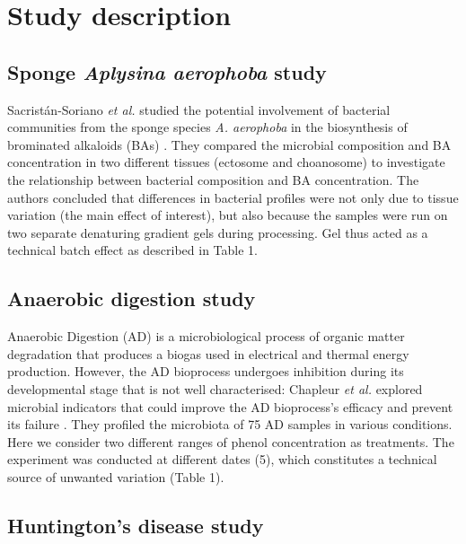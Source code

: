 \documentclass[]{book}
\begin{document}
\section{Study description}\label{study-description}

\subsection{\texorpdfstring{Sponge \emph{Aplysina aerophoba}
study}{Sponge Aplysina aerophoba study}}\label{sponge-aplysina-aerophoba-study}

Sacristán-Soriano \emph{et al.} studied the potential involvement of
bacterial communities from the sponge species \emph{A. aerophoba} in the
biosynthesis of brominated alkaloids (BAs)
\citep{sacristan2011exploring}. They compared the microbial composition
and BA concentration in two different tissues (ectosome and choanosome)
to investigate the relationship between bacterial composition and BA
concentration. The authors concluded that differences in bacterial
profiles were not only due to tissue variation (the main effect of
interest), but also because the samples were run on two separate
denaturing gradient gels during processing. Gel thus acted as a
technical batch effect as described in Table 1.

\subsection{Anaerobic digestion study}\label{anaerobic-digestion-study}

Anaerobic Digestion (AD) is a microbiological process of organic matter
degradation that produces a biogas used in electrical and thermal energy
production. However, the AD bioprocess undergoes inhibition during its
developmental stage that is not well characterised: Chapleur \emph{et
al.} explored microbial indicators that could improve the AD
bioprocess's efficacy and prevent its failure
\citep{chapleur2016increasing}. They profiled the microbiota of 75 AD
samples in various conditions. Here we consider two different ranges of
phenol concentration as treatments. The experiment was conducted at
different dates (5), which constitutes a technical source of unwanted
variation (Table 1).

\subsection{Huntington's disease study}\label{huntingtons-disease-study}
\end{document}
